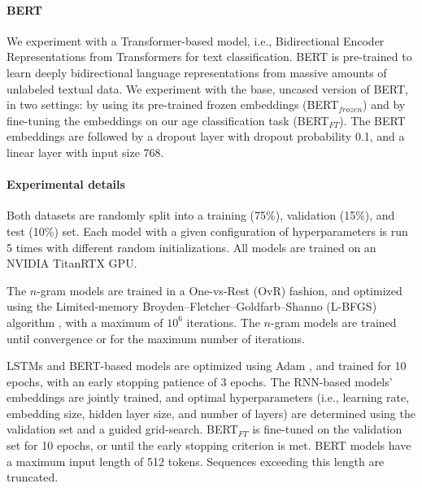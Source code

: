 \paragraph{BERT} 
We experiment with a Transformer-based model, i.e., 
Bidirectional Encoder Representations from Transformers \cite[BERT;][]{devlin-etal-2019-bert} for text classification.
BERT is pre-trained to learn deeply bidirectional language representations from massive amounts of unlabeled textual data. 
We experiment with the base, uncased version of BERT, in two settings: by using its 
pre-trained frozen embeddings (BERT$_{frozen}$) and by fine-tuning the embeddings on our age classification task (BERT$_{FT}$).
The BERT embeddings are followed by a dropout layer with dropout probability 0.1, and a linear layer with input size 768.

\paragraph{Experimental details} %

Both datasets are randomly split into a training (75\%), validation (15\%), and test (10\%) set.
Each model with a given configuration of hyperparameters is run 5 times with different random initializations. All models are trained on an NVIDIA TitanRTX GPU.

The $n$-gram models are trained in a One-vs-Rest (OvR) fashion, and optimized using the Limited-memory Broyden–Fletcher–Goldfarb–Shanno (L-BFGS) algorithm \cite{liu1989limited}, with a maximum of $10^6$ iterations. The $n$-gram models are trained until convergence or for the maximum number of iterations.

LSTMs and BERT-based models
are optimized using Adam \citep{DBLP:journals/corr/KingmaB14}, and trained for 10 epochs, with an early stopping patience of 3 epochs.
The RNN-based models' embeddings are jointly trained, and optimal hyperparameters (i.e., learning rate, embedding size, hidden layer size, and number of layers)  are determined using the validation set and a guided grid-search. %
BERT$_{FT}$ is fine-tuned on the validation set for 10 epochs, or until the early stopping criterion is met.
BERT models have a maximum input length of 512 tokens. Sequences exceeding this length are truncated.